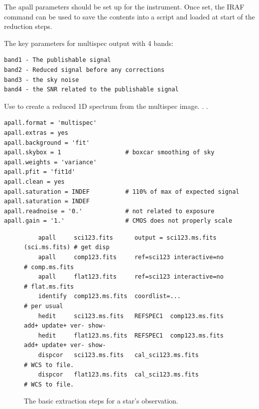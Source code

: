 The apall parameters should be set up for the instrument. Once set, the
IRAF command  can be used to save the contents into
a  script and loaded at start of the reduction steps.

The key parameters for multispec output with 4 bands:

\begingroup \fontsize{10pt}{10pt}
\selectfont
\begin{verbatim} 
band1 - The publishable signal
band2 - Reduced signal before any corrections
band3 - the sky noise
band4 - the SNR related to the publishable signal
\end{verbatim}
\endgroup

Use  to create a reduced
1D spectrum from the multispec image. .
.

\begingroup \fontsize{10pt}{10pt}
\selectfont
\begin{verbatim} 
apall.format = 'multispec'
apall.extras = yes
apall.background = 'fit'
apall.skybox = 1                  # boxcar smoothing of sky
apall.weights = 'variance'
apall.pfit = 'fit1d'
apall.clean = yes
apall.saturation = INDEF          # 110% of max of expected signal
apall.saturation = INDEF
apall.readnoise = '0.'            # not related to exposure
apall.gain = '1.'                 # CMOS does not properly scale
\end{verbatim}
\endgroup


\begin{figure}
\begingroup \fontsize{10pt}{10pt}
\selectfont
{\color{darkred}
\begin{verbatim} 
    apall     sci123.fits      output = sci123.ms.fits (sci.ms.fits) # get disp
    apall     comp123.fits     ref=sci123 interactive=no             # comp.ms.fits
    apall     flat123.fits     ref=sci123 interactive=no             # flat.ms.fits 
    identify  comp123.ms.fits  coordlist=...                         # per usual
    hedit     sci123.ms.fits   REFSPEC1  comp123.ms.fits add+ update+ ver- show-
    hedit     flat123.ms.fits  REFSPEC1  comp123.ms.fits add+ update+ ver- show-
    dispcor   sci123.ms.fits   cal_sci123.ms.fits                    # WCS to file.
    dispcor   flat123.ms.fits  cal_sci123.ms.fits                    # WCS to file.
\end{verbatim}
}
\endgroup
\caption{The basic extraction steps for a star's observation.}
\label{fig:SpecRedSteps}
\end{figure}


